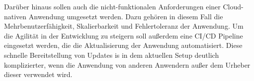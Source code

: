 Darüber hinaus sollen auch die nicht-funktionalen Anforderungen einer Cloud-nativen Anwendung umgesetzt werden. Dazu gehören in diesem Fall die Mehrbenutzerfähigkeit, Skalierbarkeit und Fehlertoleranz der Anwendung. Um die Agilität in der Entwicklung zu steigern soll außerdem eine CI/CD Pipeline eingesetzt werden, die die Aktualisierung der Anwendung automatisiert. Diese schnelle Bereitstellung von Updates is in dem aktuellen Setup deutlich komplizierter, wenn die Anwendung von anderen Anwendern außer dem Urheber dieser verwendet wird.

\pagebreak